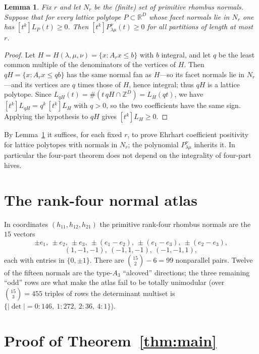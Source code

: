 \documentclass[11pt]{amsart}
\newtheorem{lemma}[theorem]{Lemma}
\theoremstyle{definition}
\newcommand{\Z}{\mathbb{Z}}
\newcommand{\R}{\mathbb{R}}
\newcommand{\lam}{\lambda}
\begin{document}
\begin{lemma}\label{lem:dilation}
Fix $r$ and let $N_r$ be the (finite) set of primitive rhombus normals. Suppose
that for every \emph{lattice} polytope $P\subset\R^{D}$ whose facet normals lie
in $N_r$ one has $[t^{k}]L_{P}(t)\ge 0$. Then $[t^{k}]P^{\nu}_{\lam\mu}(t)\ge 0$
for all partitions of length at most $r$.
\end{lemma}

\begin{proof}
Let $H=H(\lam,\mu,\nu)=\{x:A_rx\le b\}$ with $b$ integral, and let $q$ be the
least common multiple of the denominators of the vertices of $H$. Then
$qH=\{x:A_rx\le qb\}$ has the same normal fan as $H$---so its facet normals lie
in $N_r$---and its vertices are $q$ times those of $H$, hence integral; thus $qH$
is a lattice polytope. Since $L_{qH}(t)=\#(t\,qH\cap\Z^{D})=L_H(qt)$, we have
$[t^{k}]L_{qH}=q^{k}\,[t^{k}]L_{H}$ with $q>0$, so the two coefficients have the
same sign. Applying the hypothesis to $qH$ gives $[t^{k}]L_H\ge 0$.
\end{proof}

By Lemma~\ref{lem:dilation} it suffices, for each fixed $r$, to prove Ehrhart
coefficient positivity for lattice polytopes with normals in $N_r$; the
polynomial $P^{\nu}_{\lam\mu}$ inherits it. In particular the four-part theorem
does not depend on the integrality of four-part hives.

\section{The rank-four normal atlas}\label{sec:rank4}

In coordinates $(h_{11},h_{12},h_{21})$ the primitive rank-four rhombus normals
are the $15$ vectors
\[
  \pm e_1,\ \pm e_2,\ \pm e_3,\ \pm(e_1-e_2),\ \pm(e_1-e_3),\ \pm(e_2-e_3),
\]
\[
  (1,-1,-1),\ (-1,1,-1),\ (-1,-1,1),
\]
each with entries in $\{0,\pm1\}$. There are $\binom{15}{2}-6=99$ nonparallel
pairs. Twelve of the fifteen normals are the type-$A_3$ ``alcoved'' directions;
the three remaining ``odd'' rows are what make the atlas fail to be totally
unimodular (over $\binom{15}{3}=455$ triples of rows the determinant multiset is
$\{|{\det}|{=}0{:}146,\ 1{:}272,\ 2{:}36,\ 4{:}1\}$).

\section{Proof of Theorem~\ref{thm:main}}\label{sec:proofmain}
\end{document}
